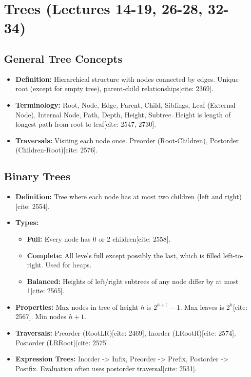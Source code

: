 \documentclass{article}
\begin{document}
\section{Trees (Lectures 14-19, 26-28, 32-34)}

\subsection{General Tree Concepts}
\begin{itemize}
    \item \textbf{Definition:} Hierarchical structure with nodes connected by edges. Unique root (except for empty tree), parent-child relationships[cite: 2369].
    \item \textbf{Terminology:} Root, Node, Edge, Parent, Child, Siblings, Leaf (External Node), Internal Node, Path, Depth, Height, Subtree. Height is length of longest path from root to leaf[cite: 2547, 2730].
    \item \textbf{Traversals:} Visiting each node once. Preorder (Root-Children), Postorder (Children-Root)[cite: 2576].
\end{itemize}

\subsection{Binary Trees}
\begin{itemize}
    \item \textbf{Definition:} Tree where each node has at most two children (left and right)[cite: 2554].
    \item \textbf{Types:}
          \begin{itemize}
              \item \textbf{Full:} Every node has 0 or 2 children[cite: 2558].
              \item \textbf{Complete:} All levels full except possibly the last, which is filled left-to-right. Used for heaps.
              \item \textbf{Balanced:} Heights of left/right subtrees of any node differ by at most 1[cite: 2565].
          \end{itemize}
    \item \textbf{Properties:} Max nodes in tree of height $h$ is $2^{h+1}-1$. Max leaves is $2^h$[cite: 2567]. Min nodes $h+1$.
    \item \textbf{Traversals:} Preorder (RootLR)[cite: 2469], Inorder (LRootR)[cite: 2574], Postorder (LRRoot)[cite: 2575].
    \item \textbf{Expression Trees:} Inorder -> Infix, Preorder -> Prefix, Postorder -> Postfix. Evaluation often uses postorder traversal[cite: 2531].
\end{itemize}
\end{document}
